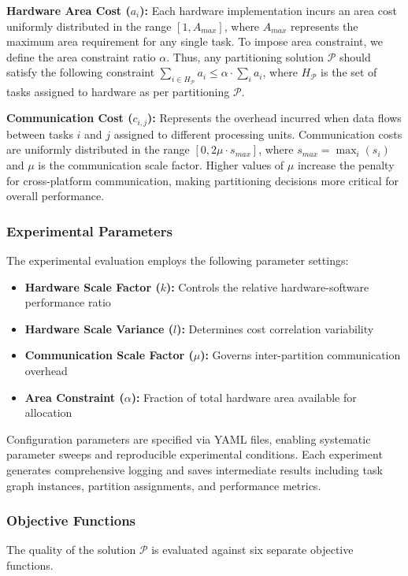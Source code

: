 \textbf{Hardware Area Cost ($a_i$):} Each hardware implementation incurs an area cost uniformly distributed in the range $[1, A_{max}]$, where $A_{max}$ represents the maximum area requirement for any single task. To impose area constraint, we define the area constraint ratio $\alpha$. Thus, any partitioning solution $\mathcal{P}$ should satisfy the following constraint $\sum_{i \in H_{\mathcal{P}}} a_i \leq \alpha \cdot \sum_i{a_i}$, where $H_{\mathcal{P}}$ is the set of tasks assigned to hardware as per partitioning $\mathcal{P}$.

\textbf{Communication Cost ($c_{i,j}$):} Represents the overhead incurred when data flows between tasks $i$ and $j$ assigned to different processing units. Communication costs are uniformly distributed in the range $[0, 2\mu \cdot s_{max}]$, where $s_{max} = \max_i(s_i)$ and $\mu$ is the communication scale factor. Higher values of $\mu$ increase the penalty for cross-platform communication, making partitioning decisions more critical for overall performance.

\subsubsection{Experimental Parameters}
The experimental evaluation employs the following parameter settings:
\begin{itemize}
    \item \textbf{Hardware Scale Factor ($k$):} Controls the relative hardware-software performance ratio
    \item \textbf{Hardware Scale Variance ($l$):} Determines cost correlation variability  
    \item \textbf{Communication Scale Factor ($\mu$):} Governs inter-partition communication overhead
    \item \textbf{Area Constraint ($\alpha$):} Fraction of total hardware area available for allocation
\end{itemize}

Configuration parameters are specified via YAML files, enabling systematic parameter sweeps and reproducible experimental conditions. Each experiment generates comprehensive logging and saves intermediate results including task graph instances, partition assignments, and performance metrics.

\subsubsection{Objective Functions}
The quality of the solution $\mathcal{P}$ is evaluated against six separate objective functions.

